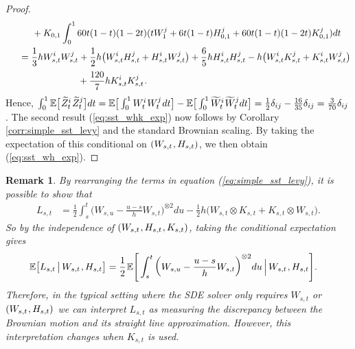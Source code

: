 \documentclass[sn-mathphys-num]{sn-jnl}%
\newtheorem{remark}{Remark}%
\newcommand{\E}{\mathbb{E}}
\newcommand{\m}{\hspace{0.25mm}}
\newcommand{\mm}{\hspace{5mm}}
\begin{document}
\begin{proof}
\begin{align*}
&\mm\mm + K_{0,1}\int_0^1 60t(1-t)(1-2t)(tW_1^j + 6t(1-t)H_{0,1}^j + 60t(1-t)(1-2t)K_{0,1}^j) dt\\
&\mm = \frac{1}{3}h W_{s,t}^{i}W_{s,t}^{j} + \frac{1}{2}h\big(W_{s,t}^i H_{s,t}^j + H_{s,t}^i W_{s,t}^j\big) + \frac{6}{5}h H_{s,t}^i H_{s,t}^j - h\big(W_{s,t}^i K_{s,t}^j + K_{s,t}^i W_{s,t}^j\big)\\[2pt]
&\hspace{27.6mm} + \frac{120}{7}h K_{s,t}^i K_{s,t}^j\m.
\end{align*}
Hence, $\int_0^1 \E\big[\m \widetilde{Z}_t^i\m \widetilde{Z}_t^j\big] dt = \E\big[\int_0^1 W_t^i\m W_t^j\m dt\big] - \E\big[\int_0^1\widetilde{W}_t^i\m\widetilde{W}_t^j dt\big] = \frac{1}{2}\delta_{ij} - \frac{16}{35}\delta_{ij} = \frac{3}{70}\delta_{ij}$.\vspace{1mm} The second result (\ref{eq:sst_whk_exp}) now follows by Corollary \ref{corr:simple_sst_levy} and the standard Brownian scaling. By taking the expectation of this conditional on $(W_{s,t}\m, H_{s,t})$, we then obtain (\ref{eq:sst_wh_exp}).
\end{proof}
\begin{remark}
By rearranging the terms in equation (\ref{eq:simple_sst_levy}), it is possible to show that
\begin{align*}
L_{s,t} & = \frac{1}{2}\int_s^t \bigg(W_{s,u} - \frac{u-s}{h}W_{s,t}\bigg)^{\otimes 2} du - \frac{1}{2}h\big(W_{s,t}\otimes K_{s,t} + K_{s,t}\otimes W_{s,t}\big).
\end{align*}
So by the independence of $(W_{s,t}\m, H_{s,t}\m, K_{s,t})$, taking the conditional expectation gives
\begin{align*}
\E\big[L_{s,t}\,\big|\, W_{s,t}\m, H_{s,t}\big] & = \frac{1}{2}\m\E\Bigg[\int_s^t\bigg(W_{s,u} - \frac{u-s}{h}W_{s,t}\bigg)^{\otimes 2} du \,\Big|\, W_{s,t}\m, H_{s,t}\Bigg].
\end{align*}
Therefore, in the typical setting where the SDE solver only requires $W_{s,t}$ or $(W_{s,t}\m, H_{s,t})$ we can interpret $L_{s,t}$ as measuring the discrepancy between the Brownian motion and its straight line approximation. However, this interpretation changes when $K_{s,t}$ is used.
\end{remark}\medbreak
\end{document}
